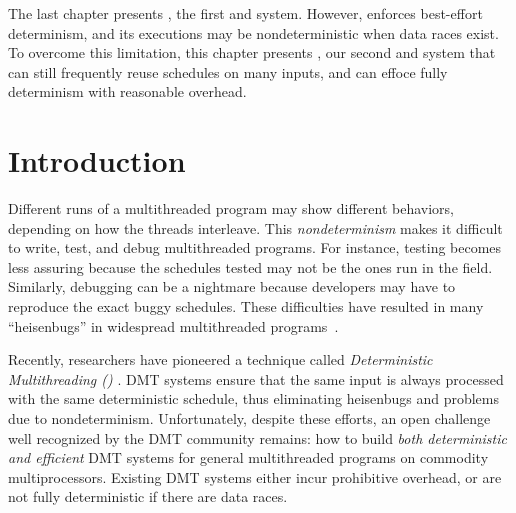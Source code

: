 The last chapter presents \tern, the first \smt and \dmt system. However, \tern
enforces best-effort determinism, and its executions may be nondeterministic
when data races exist. To overcome this limitation, this chapter presents
\peregrine, our second \smt and \dmt system that can still frequently reuse
schedules on many inputs, and can effoce fully determinism with reasonable
overhead.

\section{Introduction} \label{sec:intro}






Different runs of a multithreaded program may show different behaviors,
depending on how the threads interleave.  This \emph{nondeterminism} makes
it difficult to write, test, and debug multithreaded programs.  For
instance, testing becomes less assuring because the schedules tested may
not be the ones run in the field.  Similarly, debugging can be a nightmare
because developers may have to reproduce the exact buggy schedules.  These
difficulties have resulted in many ``heisenbugs'' in widespread
multithreaded programs~\cite{lu:concurrency-bugs}.

Recently, researchers have pioneered a technique called
\emph{Deterministic Multithreading (\dmt)} \cite{cui:tern:osdi10,dmp:asplos09,kendo:asplos09,coredet:asplos10, dos:osdi10,grace:oopsla09}.
DMT systems ensure that the same input
is always processed with the same deterministic schedule, thus eliminating
heisenbugs and problems due to nondeterminism.  Unfortunately,
despite these efforts, an open challenge~\cite{wodet11} well recognized by
the DMT community remains: how to build \emph{both deterministic
  and efficient} DMT systems for general multithreaded programs on
commodity multiprocessors.  Existing DMT systems either incur prohibitive
overhead, or are not fully deterministic if there are data races.

